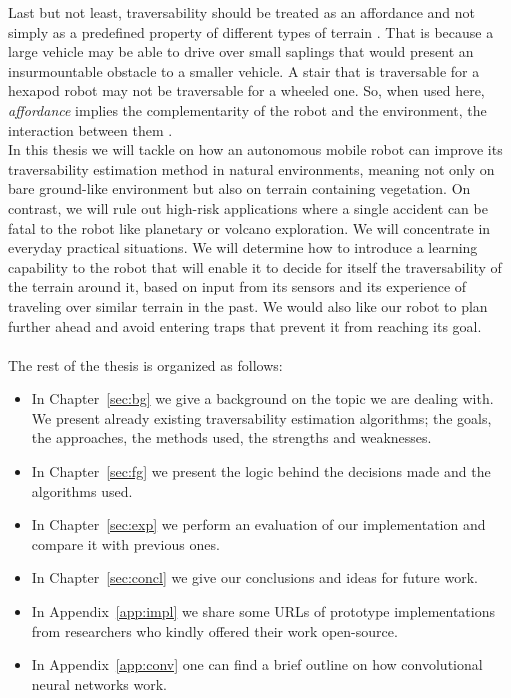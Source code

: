 \documentclass[12pt,a4paper]{report}
\newcommand{\term}{\textit}
\newcommand{\acronym}{\MakeUppercase}
\begin{document}
	Last but not least, traversability should be treated as an affordance and 
	not simply as a predefined property of different types of terrain \citep{Kim}. 
	That is because a large vehicle may be able to drive over small saplings that 
	would present an insurmountable obstacle to a smaller vehicle. A stair that is 
	traversable for a hexapod robot may not be traversable for a wheeled one. So, 
	when used here, \term{affordance} implies the complementarity of the robot and 
	the environment, the interaction between them \citep{Ugur}.
	\\
	
	In this thesis we will tackle on how an autonomous mobile robot can improve its 
	traversability estimation method in natural environments, meaning not 
	only on bare ground-like environment but also on terrain containing vegetation. 
	On contrast, we will rule out high-risk applications where a single accident can 
	be fatal to the robot like planetary or volcano exploration. We will concentrate 
	in everyday practical situations. We will determine how to introduce a learning 
	capability to the robot that will enable it to decide for itself the 
	traversability of the terrain around it, based on input from its sensors 
	and its experience of traveling over similar terrain in the past. We would also 
	like our robot to plan further ahead and avoid entering traps that prevent it 
	from reaching its goal.
	\\\\
	
	The rest of the thesis is organized as follows:
	\begin{itemize}
		\item In Chapter~\ref{sec:bg} we give a background on the topic we are dealing 
		with. We present already existing traversability estimation algorithms; the 
		goals, the approaches, the methods used, the strengths and weaknesses. 
		\item In Chapter~\ref{sec:fg} we present the logic behind the decisions made 
		and the algorithms used.
		\item In Chapter~\ref{sec:exp} we perform an evaluation of our implementation 
		and compare it with previous ones.
		\item In Chapter~\ref{sec:concl} we give our conclusions and ideas for future 
		work.
		\item In Appendix~\ref{app:impl} we share some \acronym{url}s of prototype 
		implementations from researchers who kindly offered their work open-source.
		\item In Appendix~\ref{app:conv} one can find a brief outline on how 
		convolutional neural networks work.
	\end{itemize}
	
\end{document}
